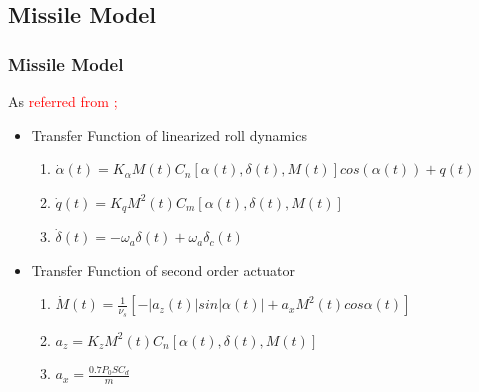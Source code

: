 \documentclass[table,10pt,red]{beamer}	%
\begin{document}
\subsection{Missile Model}
	\begin{frame}
	\frametitle{Missile Model}
	As \textcolor{red}{referred from \cite{};}
 	\begin{itemize}  %
		\item Transfer Function of linearized roll dynamics
		\begin{enumerate}
				\item $\dot{\alpha}(t)=	K_\alpha M(t) C_n [\alpha(t),\delta(t),M(t)]cos(\alpha(t)) + q(t) $
				\item $\dot{q}(t) =	K_q M^2(t) C_m [\alpha(t),\delta(t),M(t)]$
				\item $\dot{\delta}(t)	=	-\omega_a\delta(t) + \omega_a\delta_c(t)$
 		\end{enumerate}
		\end{itemize}
	\begin{itemize}
		\item  Transfer Function of second order actuator
			\begin{enumerate}
			 \item $\dot{M}(t)=\frac{1}{\nu_s}[-|a_z(t)|sin|\alpha(t)|+a_xM^2(t)cos\alpha(t)]$
			 \item $a_z = K_z M^2(t)C_n[\alpha(t),\delta(t),M(t)]$
			 \item $a_x = \frac{0.7P_0SC_d}{m}$
			\end{enumerate}
	\end{itemize}

	\end{frame}
\end{document}
